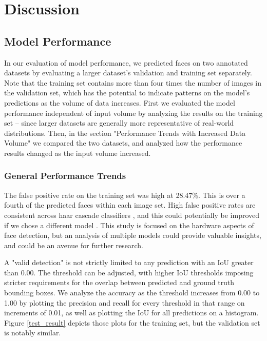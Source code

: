 \documentclass[conference]{IEEEtran}
\begin{document}
\section{Discussion}

\subsection{Model Performance}

In our evaluation of model performance, we predicted faces on two annotated datasets by evaluating a larger dataset's validation and training set separately. Note that the training set contains more than four times the number of images in the validation set, which has the potential to indicate patterns on the model's predictions as the volume of data increases. First we evaluated the model performance independent of input volume by analyzing the results on the training set -- since larger datasets are generally more representative of real-world distributions. Then, in the section "Performance Trends with Increased Data Volume" we compared the two datasets, and analyzed how the performance results changed as the input volume increased. 

\subsubsection{General Performance Trends}
The false positive rate on the training set was high at 28.47\%. This is over a fourth of the predicted faces within each image set. High false positive rates are consistent across haar cascade classifiers \cite{FiveCuimei,SixViola,EightRazzaq}, and this could potentially be improved if we chose a different model \cite{NN_accuracy}. This study is focused on the hardware aspects of face detection, but an analysis of multiple models could provide valuable insights, and could be an avenue for further research. 

A "valid detection" is not strictly limited to any prediction with an IoU greater than 0.00. The threshold can be adjusted, with higher IoU thresholds imposing stricter requirements for the overlap between predicted and ground truth bounding boxes. We analyze the accuracy as the threshold increases from 0.00 to 1.00 by plotting the precision and recall for every threshold in that range on increments of 0.01, as well as plotting the IoU for all predictions on a histogram. Figure \ref{test_result} depicts those plots for the training set, but the validation set is notably similar. 
\end{document}
